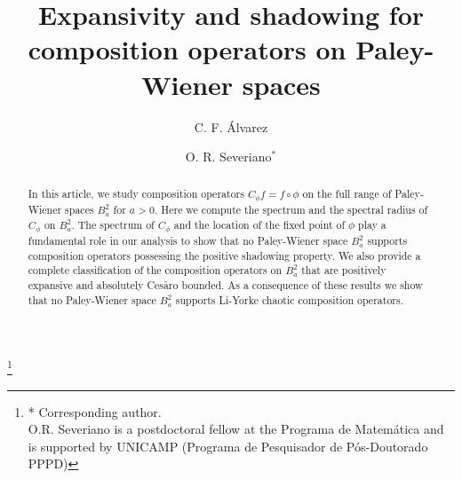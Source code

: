 \documentclass[11pt]{amsart}%
\numberwithin{equation}{section}
\theoremstyle{plain}
\theoremstyle{definition}
\theoremstyle{definition}
\begin{document}
\title[]{Expansivity and shadowing for composition operators on Paley-Wiener spaces}


    
\author{C. F. \'{A}lvarez}
   

\address{Departamento de Matemáticas, Universidad del Atlántico, Puerto Colombia, Colombia}  

    
\author{O. R. Severiano$^{*}$}

\address{ IMECC, Universidade Estadual de Campinas, Campinas, Brazil}
\thanks{* Corresponding author. \\O.R. Severiano is a postdoctoral fellow at the Programa de Matemática and is supported by UNICAMP (Programa de Pesquisador de Pós-Doutorado PPPD) }


	
\begin{abstract}

In this article, we study composition operators $C_{\phi}f=f\circ \phi$ on the full range of Paley-Wiener spaces $B^2_a$ for $a>0.$ Here we compute the spectrum and the spectral radius of $C_{\phi}$ on $B^2_a.$ The spectrum of $C_{\phi}$ and the location of the fixed point of $\phi$ play a fundamental role in our analysis to show that no Paley-Wiener space $B^2_a$ supports composition operators possessing the positive shadowing property. We also provide a complete classification of the composition operators on $B^2_a$ that are positively expansive and absolutely Cesàro bounded. As a consequence of these results we show that no Paley-Wiener space $B^2_a$ supports Li-Yorke chaotic composition operators.
\end{abstract}
	
\maketitle
	
	
	
\end{document}
